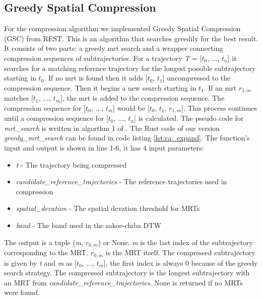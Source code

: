 \subsection{Greedy Spatial Compression}
For the compression algorithm we implemented Greedy Spatial Compression \break (GSC) from REST. This is an algorithm that searches greedily for the best result. It consists of two parts: a greedy \acrshort{mrt} search and a wrapper connecting compression sequences of subtrajectories. For a trajectory \textit{T} = [$t_0$, ..., $t_n$] it searches for a matching reference trajectory for the longest possible subtrajectory starting in $t_0$. If no \acrshort{mrt} is found then it adds [$t_0$, $t_1$] uncompressed to the compression sequence. Then it begins a new search starting in $t_1$. If an \acrshort{mrt} $r_{1,m}$ matches [$t_1$, ..., $t_m$], the \acrshort{mrt} is added to the compression sequence. The compression sequence for [$t_0$, ..., $t_m$] would be [$t_0$, $t_1$, $r_{1,m}$]. This process continues until a compression sequence for [$t_0$, ..., $t_n$] is calculated. The pseudo code for \textit{mrt\_search} is written in algorthm 1 of \textcite{zhao2018rest}. The Rust code of our version \textit{greedy\_mrt\_search} can be found in code listing \ref{lst:ca_expand}. The function's input and output is shown in line 1-6, it has 4 input parameters:



\begin{itemize}
    \item{\textit{t} - The trajectory being compressed}
    \item{\textit{candidate\_reference\_trajectories} - The reference trajectories used in compression}
    \item{\textit{spatial\_devation} - The spatial devation threshold for MRTs}
    \item{\textit{band} - The band used in the sakoe-chiba DTW}
\end{itemize}

The output is a tuple (\textit{m}, $r_{0,m}$) or None. \textit{m} is the last index of the subtrajectory corresponding to the MRT. $r_{0,m}$ is the MRT itself. The compressed subtrajectory is given by \textit{t} and \textit{m} as [$t_0$, ..., $t_m$], the first index is always 0 because of the greedy search strategy. The compressed subtrajectory is the longest subtrajectory with an MRT from \textit{candidate\_reference\_trajectories}. None is returned if no MRTs were found.

